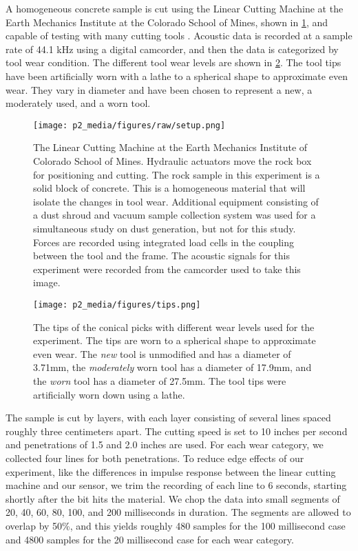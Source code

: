 A homogeneous concrete sample is cut using the Linear Cutting Machine
at the Earth Mechanics Institute at the Colorado School of Mines, shown in \ref{fig:setup},
and capable of testing with many cutting tools \cite{THYAGARAJAN2024105675}. 
Acoustic data is recorded at a sample rate of 44.1 kHz using a digital camcorder,
and then the data is categorized by tool wear condition.
The different tool wear levels are shown in \ref{fig:levels}.
The tool tips have been artificially worn with a lathe to a spherical shape to approximate even wear.
They vary in diameter and have been chosen to represent a new, a moderately used, and a worn tool.

\begin{figure}[t!]
\centering
\texttt{[image: p2\_media/figures/raw/setup.png]}
\caption{The Linear Cutting Machine at the Earth Mechanics Institute of Colorado School of Mines.
Hydraulic actuators move the rock box for positioning and cutting. The rock sample in this experiment
is a solid block of concrete. This is a homogeneous material that will isolate the changes in tool wear.
Additional equipment consisting of a dust shroud and vacuum sample collection system was used for a
 simultaneous study on dust generation, but not for this study.
Forces are recorded using integrated load cells in the coupling between the tool and the frame.
The acoustic signals for this experiment were recorded from the camcorder used to take this image.
}
\label{fig:setup}
\end{figure}

\begin{figure}[t!]
\centering
\texttt{[image: p2\_media/figures/tips.png]}
\caption{The tips of the conical picks with different wear levels used for the experiment.
The tips are worn to a spherical shape to approximate even wear. The \textit{new} tool is unmodified
and has a diameter of 3.71mm, the \textit{moderately} worn tool has a diameter of 17.9mm,
 and the \textit{worn} tool has a diameter of 27.5mm. The tool tips were artificially worn down using a lathe.}
\label{fig:levels}
\end{figure}

The sample is cut by layers, with each layer consisting of several lines spaced roughly three centimeters apart.
The cutting speed is set to 10 inches per second and penetrations of 1.5 and 2.0 inches are used.
For each wear category, we collected four lines for both penetrations. 
To reduce edge effects of our experiment, 
like the differences in impulse response
between the linear cutting machine and our sensor,
we trim the recording of each line to 6 seconds,
starting shortly after the bit hits the material. 
We chop the data into small segments of 20, 40, 60, 80, 100, and 200 milliseconds in duration.
The segments are allowed to overlap by 50\%, and
this yields roughly 480 samples for the 100 millisecond case and 
4800 samples for the 20 millisecond case for each wear category.

